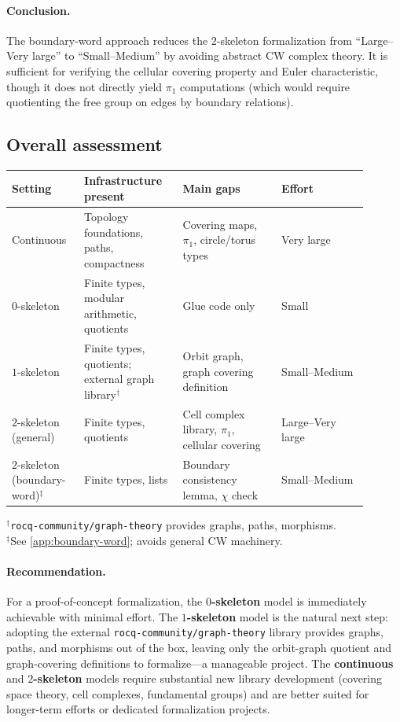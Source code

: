 \documentclass[11pt,a4paper]{article}
\theoremstyle{definition}
\theoremstyle{remark}
\begin{document}
\paragraph{Conclusion.}
The boundary-word approach reduces the \(2\)-skeleton formalization from ``Large--Very large'' to ``Small--Medium'' by avoiding abstract CW complex theory. It is sufficient for verifying the cellular covering property and Euler characteristic, though it does not directly yield \(\pi_1\) computations (which would require quotienting the free group on edges by boundary relations).

\subsection{Overall assessment}
\label{app:overall}

\begin{center}
\begin{tabular}{p{0.18\linewidth} p{0.25\linewidth} p{0.25\linewidth} p{0.22\linewidth}}
\hline
\textbf{Setting} & \textbf{Infrastructure present} & \textbf{Main gaps} & \textbf{Effort}\\
\hline
Continuous & Topology foundations, paths, compactness & Covering maps, \(\pi_1\), circle/torus types & Very large\\
\(0\)-skeleton & Finite types, modular arithmetic, quotients & Glue code only & Small\\
\(1\)-skeleton & Finite types, quotients; external graph library$^\dagger$ & Orbit graph, graph covering definition & Small--Medium\\
\(2\)-skeleton (general) & Finite types, quotients & Cell complex library, \(\pi_1\), cellular covering & Large--Very large\\
\(2\)-skeleton (boundary-word)$^\ddagger$ & Finite types, lists & Boundary consistency lemma, \(\chi\) check & Small--Medium\\
\hline
\end{tabular}
\end{center}
{\small $^\dagger$\texttt{rocq-community/graph-theory} provides graphs, paths, morphisms.}\\
{\small $^\ddagger$See \cref{app:boundary-word}; avoids general CW machinery.}

\paragraph{Recommendation.}
For a proof-of-concept formalization, the \textbf{\(0\)-skeleton} model is immediately achievable with minimal effort. The \textbf{\(1\)-skeleton} model is the natural next step: adopting the external \texttt{rocq-community/graph-theory} library provides graphs, paths, and morphisms out of the box, leaving only the orbit-graph quotient and graph-covering definitions to formalize---a manageable project. The \textbf{continuous} and \textbf{\(2\)-skeleton} models require substantial new library development (covering space theory, cell complexes, fundamental groups) and are better suited for longer-term efforts or dedicated formalization projects.
\end{document}

